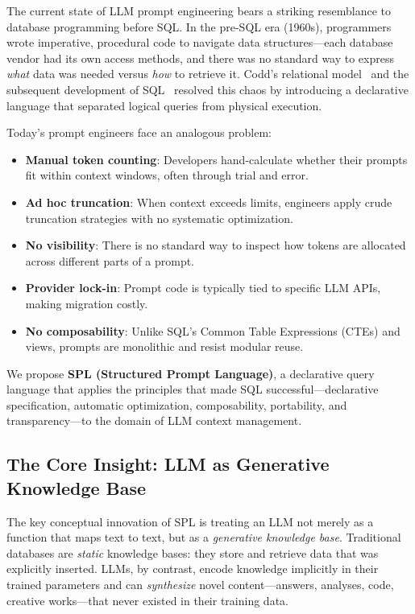 \documentclass[11pt,a4paper]{article}
\begin{document}
The current state of LLM prompt engineering bears a striking resemblance to database programming before SQL. In the pre-SQL era (1960s), programmers wrote imperative, procedural code to navigate data structures---each database vendor had its own access methods, and there was no standard way to express \emph{what} data was needed versus \emph{how} to retrieve it. Codd's relational model~\citep{codd1970relational} and the subsequent development of SQL~\citep{chamberlin1974sequel} resolved this chaos by introducing a declarative language that separated logical queries from physical execution.

Today's prompt engineers face an analogous problem:

\begin{itemize}[nosep]
  \item \textbf{Manual token counting}: Developers hand-calculate whether their prompts fit within context windows, often through trial and error.
  \item \textbf{Ad hoc truncation}: When context exceeds limits, engineers apply crude truncation strategies with no systematic optimization.
  \item \textbf{No visibility}: There is no standard way to inspect how tokens are allocated across different parts of a prompt.
  \item \textbf{Provider lock-in}: Prompt code is typically tied to specific LLM APIs, making migration costly.
  \item \textbf{No composability}: Unlike SQL's Common Table Expressions (CTEs) and views, prompts are monolithic and resist modular reuse.
\end{itemize}

We propose \textbf{SPL (Structured Prompt Language)}, a declarative query language that applies the principles that made SQL successful---declarative specification, automatic optimization, composability, portability, and transparency---to the domain of LLM context management.

\subsection{The Core Insight: LLM as Generative Knowledge Base}

The key conceptual innovation of SPL is treating an LLM not merely as a function that maps text to text, but as a \emph{generative knowledge base}. Traditional databases are \emph{static} knowledge bases: they store and retrieve data that was explicitly inserted. LLMs, by contrast, encode knowledge implicitly in their trained parameters and can \emph{synthesize} novel content---answers, analyses, code, creative works---that never existed in their training data.
\end{document}
